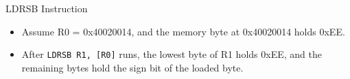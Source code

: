 \documentclass[9pt,aspectratio=169,xcolor=table]{beamer}
\begin{document}
\begin{frame}[fragile]{LDRSB Instruction}
{%
	}
	\vspace{4mm}

	\begin{itemize}
		\item Assume R0 = 0x40020014, and the \alert{memory byte} at 0x40020014 holds 0xEE.
		\item After \texttt{LDRSB R1, [R0]} runs, the lowest byte of R1 holds 0xEE, and the remaining bytes hold the sign bit of the loaded byte.
	\end{itemize}
\end{frame}
\end{document}

